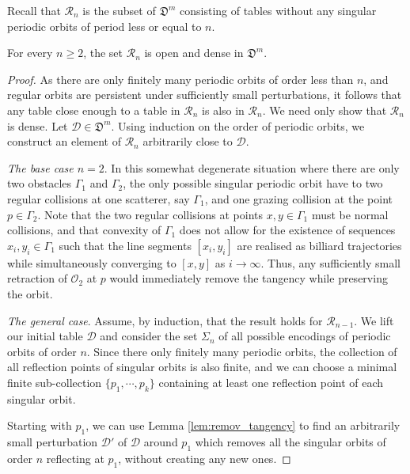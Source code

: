 \documentclass[reqno,11pt]{amsart}
\begin{document}
Recall that \( \mathcal{R}_n \) is the subset of \( \mathfrak{D}^m \) consisting of tables without any singular periodic orbits of period less or equal to \( n \). 
\begin{lemma}\label{lem:dense_nonsingular_n}
For every \( n\geq 2 \), the set \( \mathcal{R}_n \) is open and dense in \( \mathfrak{D}^m \). 
\end{lemma}
\begin{proof}
    As there are only finitely many periodic orbits of order less than \( n \), and regular orbits are persistent under sufficiently small perturbations, it follows that any table close enough to a table in \( \mathcal{R}_n \) is also in \( \mathcal{R}_n \).
    We need only show that \( \mathcal{R}_n \) is dense.
    Let \( \mathcal{D} \in \mathfrak{D}^m \).
    Using induction on the order of periodic orbits, we construct an element of \( \mathcal{R}_n \) arbitrarily close to \( \mathcal{D} \). \\
    \par\noindent\emph{The base case \( n=2 \)}. In this somewhat degenerate situation where there are only two obstacles \( \Gamma_1 \) and \( \Gamma_2 \), the only possible singular periodic orbit have to two regular collisions at one scatterer, say \( \Gamma_1 \), and one grazing collision at the point \( p \in \Gamma_2 \).
    Note that the two regular collisions at points \( x, y \in \Gamma_1 \) must be normal collisions, and that convexity of \( \Gamma_1 \) does not allow for the existence of sequences \( x_i, y_i \in \Gamma_1 \) such that the line segments \( [x_i,y_i] \) are realised as billiard trajectories while simultaneously converging to \( [x,y] \) as \( i \to \infty \). 
    Thus, any sufficiently small retraction of \( \mathcal{O}_2 \) at \( p \) would immediately remove the tangency while preserving the orbit. \\
    \par\noindent\emph{The general case}. Assume, by induction, that the result holds for \( \mathcal{R}_{n-1} \).
    We lift our initial table \( \mathcal{D} \) and consider the set \( \Sigma_n \) of all possible encodings of periodic orbits of order \( n \).
    Since there only finitely many periodic orbits, the collection of all reflection points of singular orbits is also finite, and we can choose a minimal finite sub-collection \( \{p_1, \cdots, p_k\} \) containing at least one reflection point of each singular orbit. 
    \par Starting with \( p_1 \), we can use Lemma \ref{lem:remov_tangency} to find an arbitrarily small perturbation \( \mathcal{D}' \) of \( \mathcal{D} \) around \( p_1 \) which removes all the singular orbits of order \( n \) reflecting at \( p_1 \), without creating any new ones.

\end{proof}
\end{document}
